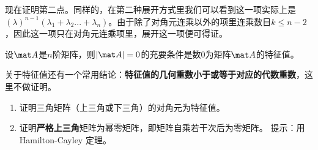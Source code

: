 现在证明第二点。同样的，在第二种展开方式里我们可以看到这一项实际上是$(\lambda)^{n-1}(\lambda_1+\lambda_2...+\lambda_n)$。由于除了对角元连乘以外的项里连乘数目$k\le n-2$，因此这一项只在对角元连乘项里，展开这一项便可得证。
\begin{corollary}{}
设$\mat A$是$n$阶矩阵，则$|\mat A|=0$的充要条件是数$0$为矩阵$\mat A$的特征值。
\end{corollary}
关于特征值还有一个常用结论：\textbf{特征值的几何重数小于或等于对应的代数重数}，这里不做证明。
\begin{exercise}{}
\begin{enumerate}
\item 证明三角矩阵（上三角或下三角）的对角元为特征值。
\item 证明\textbf{严格上三角}矩阵为幂零矩阵，即矩阵自乘若干次后为零矩阵。 提示：用Hamilton-Cayley 定理。
\end{enumerate}
\end{exercise}